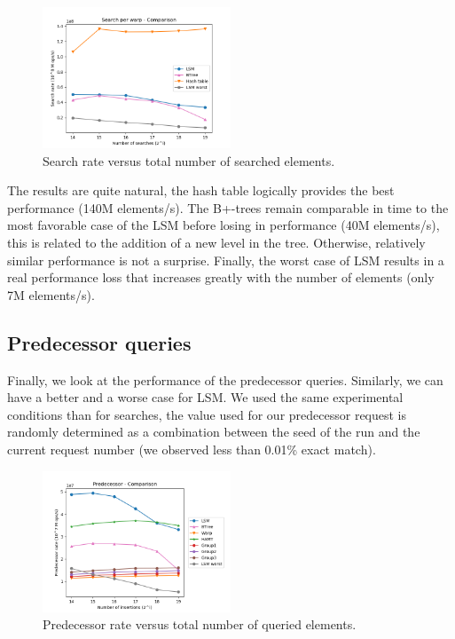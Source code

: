 \documentclass[conference]{IEEEtran}
\begin{document}
\begin{figure}[htbp]
\centerline{\includegraphics[width=0.5\textwidth]{SearchRate1.png}}
\caption{Search rate versus total number of searched elements.}
\label{Search rate}
\end{figure}

The results are quite natural, the hash table logically provides the best performance (140M elements/s). The B+-trees remain comparable in time to the most favorable case of the LSM before losing in performance (40M elements/s), this is related to the addition of a new level in the tree. Otherwise, relatively similar performance is not a surprise. Finally, the worst case of LSM results in a real performance loss that increases greatly with the number of elements (only 7M elements/s).

\subsection{Predecessor queries}

Finally, we look at the performance of the predecessor queries. Similarly, we can have a better and a worse case for LSM. We used the same experimental conditions than for searches, the value used for our predecessor request is randomly determined as a combination between the seed of the run and the current request number (we observed less than 0.01\% exact match).

\begin{figure}[htbp]
\centerline{\includegraphics[width=0.5\textwidth]{PredecessorRate1.png}}
\caption{Predecessor rate versus total number of queried elements.}
\label{Predecessor rate}
\end{figure}
\end{document}
